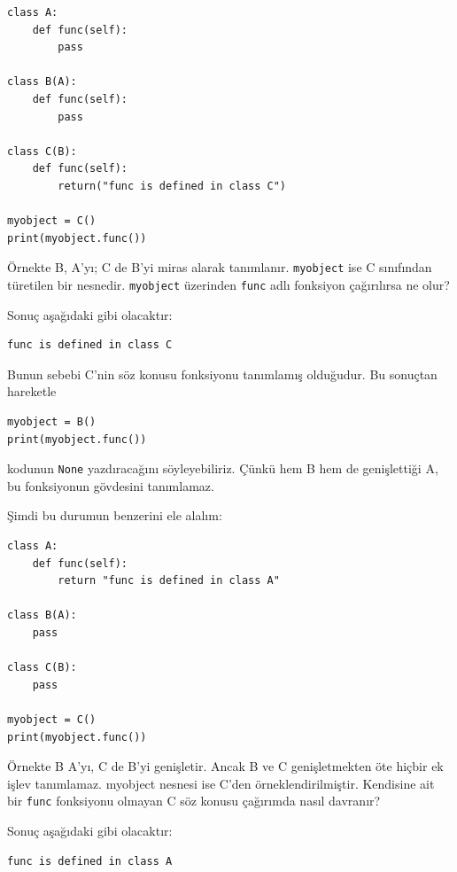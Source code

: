 \documentclass[12pt]{report}
\begin{document}
\begin{Verbatim}[frame = single]
class A:
	def func(self):
		pass

class B(A):
	def func(self):
		pass

class C(B):
	def func(self):
		return("func is defined in class C")
		
myobject = C()
print(myobject.func())
\end{Verbatim}

Örnekte B, A'yı; C de B'yi miras alarak tanımlanır. \texttt{myobject} ise C sınıfından türetilen bir nesnedir. \texttt{myobject} üzerinden \texttt{func} adlı fonksiyon çağırılırsa ne olur?

Sonuç aşağıdaki gibi olacaktır:

\begin{Verbatim}[frame = single]
func is defined in class C
\end{Verbatim}

Bunun sebebi C'nin söz konusu fonksiyonu tanımlamış olduğudur. Bu sonuçtan hareketle 

\begin{Verbatim}[frame = single]
myobject = B()
print(myobject.func())
\end{Verbatim}

kodunun \texttt{None} yazdıracağını söyleyebiliriz. Çünkü hem B hem de genişlettiği A, bu fonksiyonun gövdesini tanımlamaz.

Şimdi bu durumun benzerini ele alalım:

\begin{Verbatim}[frame = single]
class A:
	def func(self):
		return "func is defined in class A"

class B(A):
	pass

class C(B):
	pass

myobject = C()
print(myobject.func())
\end{Verbatim}

Örnekte B A'yı, C de B'yi genişletir. Ancak B ve C genişletmekten öte hiçbir ek işlev tanımlamaz. myobject nesnesi ise C'den örneklendirilmiştir. Kendisine ait bir \texttt{func} fonksiyonu olmayan C söz konusu çağırımda nasıl davranır?

Sonuç aşağıdaki gibi olacaktır:


\begin{Verbatim}[frame = single]
func is defined in class A
\end{Verbatim}
\end{document}
